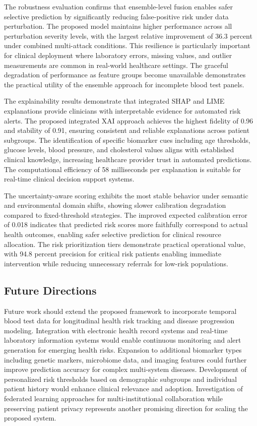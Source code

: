 \documentclass[journal, onecolumn]{IEEEtran}
\begin{document}
The robustness evaluation confirms that ensemble-level fusion enables safer selective prediction by significantly reducing false-positive risk under data perturbation.
The proposed model maintains higher performance across all perturbation severity levels, with the largest relative improvement of 36.3 percent under combined multi-attack conditions.
This resilience is particularly important for clinical deployment where laboratory errors, missing values, and outlier measurements are common in real-world healthcare settings.
The graceful degradation of performance as feature groups become unavailable demonstrates the practical utility of the ensemble approach for incomplete blood test panels.

The explainability results demonstrate that integrated SHAP and LIME explanations provide clinicians with interpretable evidence for automated risk alerts.
The proposed integrated XAI approach achieves the highest fidelity of 0.96 and stability of 0.91, ensuring consistent and reliable explanations across patient subgroups.
The identification of specific biomarker cues including age thresholds, glucose levels, blood pressure, and cholesterol values aligns with established clinical knowledge, increasing healthcare provider trust in automated predictions.
The computational efficiency of 58 milliseconds per explanation is suitable for real-time clinical decision support systems.

The uncertainty-aware scoring exhibits the most stable behavior under semantic and environmental domain shifts, showing slower calibration degradation compared to fixed-threshold strategies.
The improved expected calibration error of 0.018 indicates that predicted risk scores more faithfully correspond to actual health outcomes, enabling safer selective prediction for clinical resource allocation.
The risk prioritization tiers demonstrate practical operational value, with 94.8 percent precision for critical risk patients enabling immediate intervention while reducing unnecessary referrals for low-risk populations.

\subsection{Future Directions}
Future work should extend the proposed framework to incorporate temporal blood test data for longitudinal health risk tracking and disease progression modeling.
Integration with electronic health record systems and real-time laboratory information systems would enable continuous monitoring and alert generation for emerging health risks.
Expansion to additional biomarker types including genetic markers, microbiome data, and imaging features could further improve prediction accuracy for complex multi-system diseases.
Development of personalized risk thresholds based on demographic subgroups and individual patient history would enhance clinical relevance and adoption.
Investigation of federated learning approaches for multi-institutional collaboration while preserving patient privacy represents another promising direction for scaling the proposed system.
\end{document}
